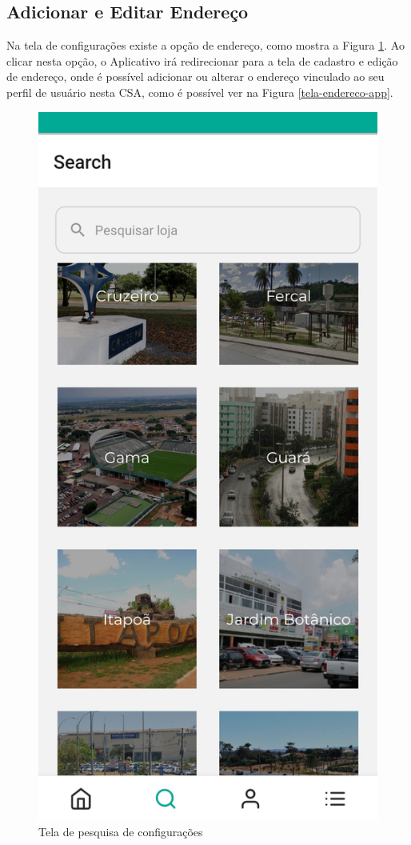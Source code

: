 \subsection{Adicionar e Editar Endereço}
Na tela de configurações existe a opção de endereço, como mostra a Figura \ref{tela-config-app}. Ao clicar nesta opção, o Aplicativo irá redirecionar para a tela de cadastro e edição de endereço, onde é possível adicionar ou alterar o endereço vinculado ao seu perfil de usuário nesta CSA, como é possível ver na Figura \ref{tela-endereco-app}.

\begin{figure}[h]
	\centering
	\includegraphics[keepaspectratio=true,scale=0.16]{figuras/filtro_loja_regiao.jpg}
	\caption{Tela de pesquisa de configurações}
        \label{tela-config-app}
\end{figure}


